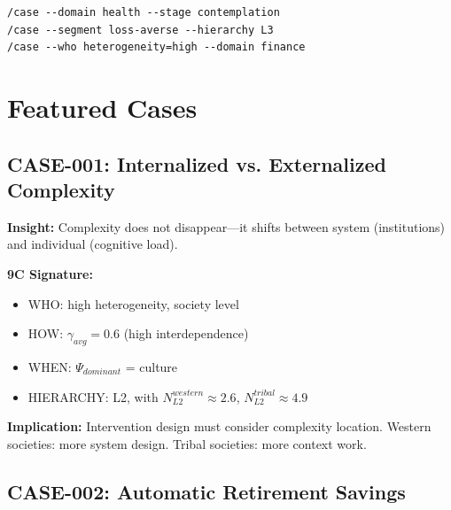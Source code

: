 \begin{verbatim}
/case --domain health --stage contemplation
/case --segment loss-averse --hierarchy L3
/case --who heterogeneity=high --domain finance
\end{verbatim}

\section{Featured Cases}

\subsection{CASE-001: Internalized vs. Externalized Complexity}

\begin{tcolorbox}[colback=yellow!5, colframe=yellow!50, title=Cross-Cultural Complexity]
\textbf{Insight:} Complexity does not disappear---it shifts between system (institutions) and individual (cognitive load).

\textbf{9C Signature:}
\begin{itemize}
    \item WHO: high heterogeneity, society level
    \item HOW: $\gamma_{avg} = 0.6$ (high interdependence)
    \item WHEN: $\Psi_{dominant}$ = culture
    \item HIERARCHY: L2, with $N_{L2}^{western} \approx 2.6$, $N_{L2}^{tribal} \approx 4.9$
\end{itemize}

\textbf{Implication:} Intervention design must consider complexity location. Western societies: more system design. Tribal societies: more context work.
\end{tcolorbox}

\subsection{CASE-002: Automatic Retirement Savings}

